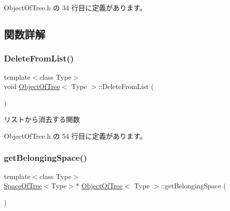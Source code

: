  Object\+Of\+Tree.\+h の 34 行目に定義があります。



\subsection{関数詳解}
\mbox{\label{class_object_of_tree_a1356595b29749ca4555ca61a5bb30388}} 
\subsubsection{\texorpdfstring{Delete\+From\+List()}{DeleteFromList()}}
{\footnotesize\ttfamily template$<$class Type$>$ \\
void \mbox{\hyperlink{class_object_of_tree}{Object\+Of\+Tree}}$<$ Type $>$\+::Delete\+From\+List (\begin{DoxyParamCaption}{ }\end{DoxyParamCaption})\hspace{0.3cm}{\ttfamily [inline]}}



リストから消去する関数 



 Object\+Of\+Tree.\+h の 54 行目に定義があります。

\mbox{\label{class_object_of_tree_a94c5724ddb841da0bb31ab6ae63df304}} 
\subsubsection{\texorpdfstring{get\+Belonging\+Space()}{getBelongingSpace()}}
{\footnotesize\ttfamily template$<$class Type$>$ \\
\mbox{\hyperlink{class_space_of_tree}{Space\+Of\+Tree}}$<$Type$>$$\ast$ \mbox{\hyperlink{class_object_of_tree}{Object\+Of\+Tree}}$<$ Type $>$\+::get\+Belonging\+Space (\begin{DoxyParamCaption}{ }\end{DoxyParamCaption})\hspace{0.3cm}{\ttfamily [inline]}}



